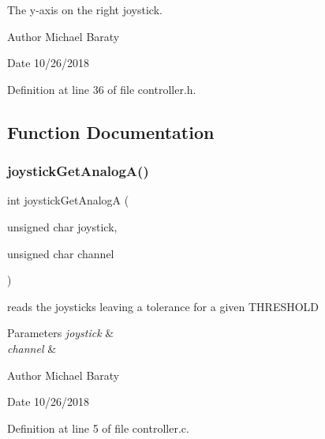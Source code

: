 The y-\/axis on the right joystick. 

\begin{DoxyAuthor}{Author}
Michael Baraty 
\end{DoxyAuthor}
\begin{DoxyDate}{Date}
10/26/2018 
\end{DoxyDate}


Definition at line 36 of file controller.\+h.



\subsection{Function Documentation}
\mbox{\label{controller_8h_a03560084f97816fe3f0d05f788f03f06}} 
\subsubsection{joystick\+Get\+Analog\+A()}
{\footnotesize\ttfamily int joystick\+Get\+AnalogA (\begin{DoxyParamCaption}\item[{unsigned char}]{joystick,  }\item[{unsigned char}]{channel }\end{DoxyParamCaption})}



reads the joysticks leaving a tolerance for a given T\+H\+R\+E\+S\+H\+O\+LD 


\begin{DoxyParams}{Parameters}
{\em joystick} & \\
\hline
{\em channel} & \\
\hline
\end{DoxyParams}
\begin{DoxyAuthor}{Author}
Michael Baraty 
\end{DoxyAuthor}
\begin{DoxyDate}{Date}
10/26/2018 
\end{DoxyDate}


Definition at line 5 of file controller.\+c.

